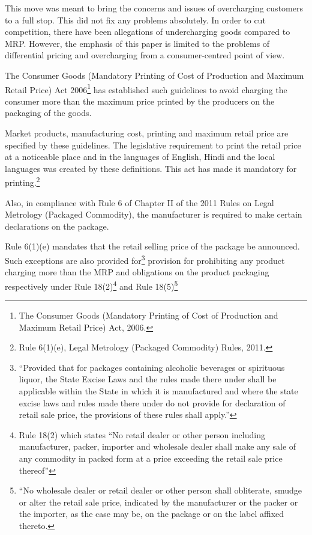 \begin{multicols}{2}
\noi
This move was meant to bring the concerns and issues of overcharging customers to a full stop.
This did not fix any problems absolutely. In order to cut competition, there have been allegations of undercharging goods compared to MRP. However, the emphasis of this paper is
limited to the problems of differential pricing and overcharging from a consumer-centred point
of view.

\vspace{-.15cm}

\noi
The Consumer Goods (Mandatory Printing of Cost of Production and Maximum Retail Price)
Act 2006\footnote{The Consumer Goods (Mandatory Printing of Cost of Production and Maximum Retail Price) Act, 2006.} has established such guidelines to avoid charging the consumer more than the
maximum price printed by the producers on the packaging of the goods.

\vspace{-.15cm}

\noi
Market products, manufacturing cost, printing and maximum retail price are specified by these
guidelines. The legislative requirement to print the retail price at a noticeable place and in the
languages of English, Hindi and the local languages was created by these definitions. This act
has made it mandatory for printing.\footnote{Rule 6(1)(e), Legal Metrology (Packaged Commodity) Rules, 2011.}

\vspace{-.15cm}

\noi
Also, in compliance with Rule 6 of Chapter II of the 2011 Rules on Legal Metrology (Packaged
Commodity), the manufacturer is required to make certain declarations on the package.

\noi
Rule 6(1)(e) mandates that the retail selling price of the package be announced. Such
exceptions are also provided for\footnote{“Provided that for packages containing alcoholic beverages or spirituous liquor, the State Excise Laws and the rules made there under shall be applicable within the State in which it is manufactured and where the state excise laws and rules made there under do not provide for declaration of retail sale price, the provisions of these rules shall apply.”} provision for prohibiting any product charging more than the MRP and obligations on the product packaging respectively under Rule 18(2)\footnote{Rule 18(2) which states “No retail dealer or other person including manufacturer, packer, importer and wholesale dealer shall make any sale of any commodity in packed form at a price exceeding the retail sale price thereof”} and Rule 18(5)\footnote{“No wholesale dealer or retail dealer or other person shall obliterate, smudge or alter the retail sale price, indicated by the manufacturer or the packer or the importer, as the case may be, on the package or on the label affixed thereto.}


\end{multicols}
